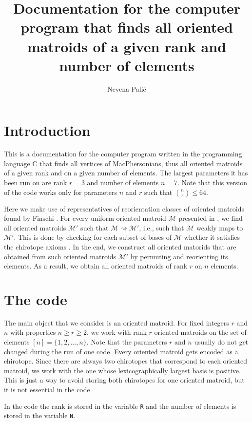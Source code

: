 \documentclass[11pt,twoside,a4paper]{article}
\title{Documentation for the computer program that finds all oriented matroids of a given rank and number of elements}
\author{Nevena Pali\'c}
\newcommand{\M}{\mathcal{M}}
\newcommand{\wm}{\rightsquigarrow}
\theoremstyle{definition}
\theoremstyle{plain}
\begin{document}
\maketitle

\section{Introduction}

This is a documentation for the computer program written in the programming language C that finds all vertices of MacPhersonians, thus all oriented matroids of a given rank and on a given number of elements. The largest parameters it has been run on are rank $r=3$ and number of elements $n=7$. Note that this version of the code works only for parameters $n$ and $r$ such that $\binom{n}{r} \leq 64$. 

Here we make use of representatives of reorientation classes of oriented matroids found by Finschi \cite{Fin}. For every uniform oriented matroid $\M$ presented in \cite{Fin}, we find all oriented matroids $\M'$ such that $\M \wm \M'$, i.e., such that $\M$ weakly maps to $\M'$. This is done by checking for each subset of bases of $\M$ whether it satisfies the chirotope axioms \cite[Def.~3.5.3~\&~Lemma~3.5.4]{BLSWZ}. In the end, we construct all oriented matorids that are obtained from such oriented matroids $\M'$ by permuting and reorienting its elements. As a result, we obtain all oriented matroids of rank $r$ on $n$ elements.

\section{The code}

The main object that we consider is an oriented matroid. For fixed integers $r$ and $n$ with properties $n\geq r \geq 2$, we work with rank $r$ oriented matroids on the set of elements $[n]=\{1,2,\dots,n\}$. Note that the parameters $r$ and $n$ usually do not get changed during the run of one code. Every oriented matroid gets encoded as a chirotope. Since there are always two chirotopes that correspond to each oriented matroid, we work with the one whose lexicographically largest basis is positive. This is just a way to avoid storing both chirotopes for one oriented matroid, but it is not essential in the code. 

In the code the rank is stored in the variable \texttt{R} and the number of elements is stored in the variable \texttt{N}.
\end{document}
